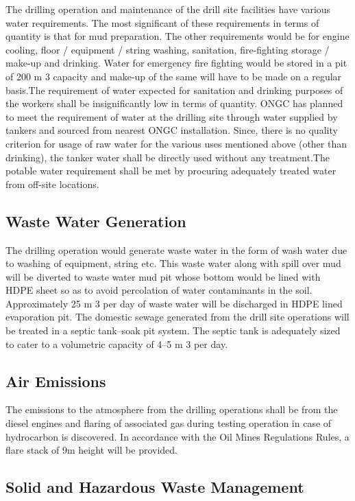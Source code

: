 \documentclass[11pt,a4paper]{article}
\begin{document}
The drilling operation and maintenance of the drill site facilities have various water requirements. The most significant of these requirements in terms of quantity is that for mud preparation. The other requirements would be for engine cooling, floor / equipment / string washing, sanitation, fire-fighting storage / make-up and
drinking. Water for emergency fire fighting would be stored in a pit of 200 m 3 capacity and make-up of the same will have to be made on a regular basis.The requirement of water expected for sanitation and drinking purposes of the workers shall be insignificantly low in terms of quantity. ONGC has planned to meet the requirement of water at the drilling site through water supplied by tankers and sourced from nearest ONGC installation. Since, there is no quality criterion for usage of raw water for the various uses mentioned above (other than drinking), the tanker water shall be directly used without any treatment.The potable water requirement shall be met by procuring adequately treated water from off-site locations.

\subsection{\textbf{Waste Water Generation}}

The drilling operation would generate waste water in the form of wash water due to washing of equipment, string etc. This waste water along with spill over mud will be diverted to waste water mud pit whose bottom would be lined with HDPE sheet so as to avoid percolation of water contaminants in the soil. Approximately 25 m 3 per day of waste water will be discharged in HDPE lined evaporation pit. The domestic sewage generated from the drill site operations will be treated in a septic tank–soak pit system. The septic tank is adequately sized to cater to a volumetric capacity of 4–5 m 3 per day.

\subsection{\textbf{Air Emissions}}

The emissions to the atmosphere from the drilling operations shall be from the diesel engines and flaring of associated gas during testing operation in case of hydrocarbon is discovered. In accordance with the Oil Mines Regulations Rules, a flare stack of 9m height will be provided.

\subsection{\textbf{Solid and Hazardous Waste Management}}
\end{document}
